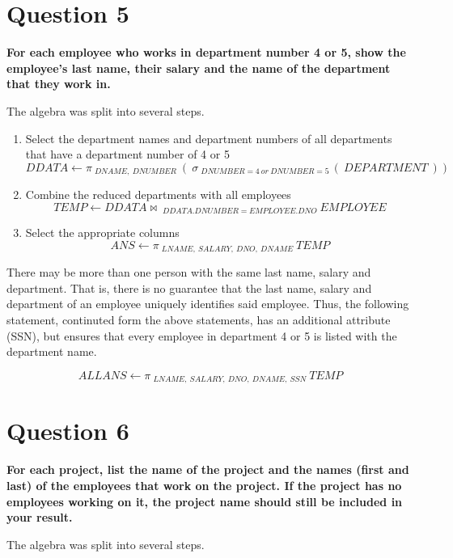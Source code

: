 \documentclass{article}
\begin{document}
\section{Question 5}

    \textbf{For each employee who works in department number 4 or 5, show the employee's last name, their salary and the name of the department that they work in.}

    The algebra was split into several steps.

    \begin{enumerate}
        \item Select the department names and department numbers of all departments that have a department number of 4 or 5
        \[ DDATA \gets \pi \: _{DNAME, \: DNUMBER} \: ( \: \sigma \: _{DNUMBER = 4 \: or \: DNUMBER = 5 \: } ( \: DEPARTMENT \:)) \]
        \item Combine the reduced departments with all employees
        \[ TEMP \gets DDATA \bowtie \: _{DDATA.DNUMBER = EMPLOYEE.DNO} \: EMPLOYEE \]
        \item Select the appropriate columns
        \[ ANS \gets \pi \: _{LNAME, \: SALARY, \: DNO, \: DNAME} \: TEMP \]
    \end{enumerate}

    There may be more than one person with the same last name, salary and department. That is, there is no guarantee that the last name, salary and department of an employee uniquely identifies said employee. Thus, the following statement, continuted form the above statements, has an additional attribute (SSN), but ensures that every employee in department 4 or 5 is listed with the department name.

    \[ ALLANS \gets \pi\:  _{LNAME, \: SALARY, \: DNO, \: DNAME, \: SSN} \: TEMP\]

\section{Question 6}

    \textbf{For each project, list the name of the project and the names (first and last) of the employees that work on the project.  If the project has no employees working on it, the project name should still be included in your result.}
    
    The algebra was split into several steps.
\end{document}
